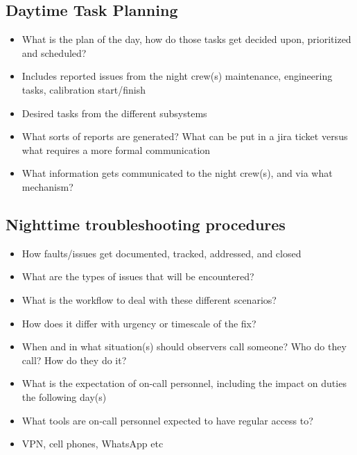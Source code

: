 \documentclass[SE,authoryear,toc]{lsstdoc}
\begin{document}
\subsection{Daytime Task Planning}
\begin{itemize}
\item What is the plan of the day, how do those tasks get decided upon, prioritized and scheduled?
\item Includes reported issues from the night crew(s) maintenance, engineering tasks, calibration start/finish
\item Desired tasks from the different subsystems
\item What sorts of reports are generated? What can be put in a jira ticket versus what requires a more formal communication
\item What information gets communicated to the night crew(s), and via what mechanism?
\end{itemize}

\subsection{Nighttime troubleshooting procedures}
\begin{itemize}
\item How faults/issues get documented, tracked, addressed, and closed
\item What are the types of issues that will be encountered?
\item What is the workflow to deal with these different scenarios?
\item How does it differ with urgency or timescale of the fix?
\item When and in what situation(s) should observers call someone? 
      Who do they call? 
      How do they do it? 
\item What is the expectation of on-call personnel, including the impact on duties the following day(s)
\item What tools are on-call personnel expected to have regular access to?
\item VPN, cell phones, WhatsApp etc
\end{itemize}
\end{document}
